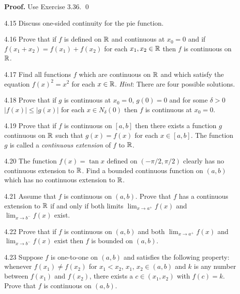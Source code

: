 \begin{enumerate}
      \textbf{Proof.} Use Exercise 3.36. \qed
   \item[4.15] Discuss one-sided continuity for the pie function.
   \item[4.16] Prove that if $f$ is defined on $\mathbb{R}$ and continuous at $x_0 = 0$
               and if $f(x_1 + x_2) = f(x_1) + f(x_2)$ for each
               $x_1, x_2 \in \mathbb{R}$ then $f$ is continuous on $\mathbb{R}$.
   \item[4.17] Find all functions $f$ which are continuous on $\mathbb{R}$ and which
               satisfy the equation $f(x)^2 = x^2$ for each $x \in \mathbb{R}$.
               \textit{Hint}: There are four possible solutions.
   \item[4.18] Prove that if $g$ is continuous at $x_0 = 0$, $g(0) = 0$ and for
               some $\delta > 0$ $|f(x)| \le |g(x)|$ for each
               $x \in N_\delta(0)$ then $f$ is continuous at $x_0 = 0$.
   \item[4.19] Prove that if $f$ is continuous on $[a, b]$ then there exists a
               function $g$ continuous on $\mathbb{R}$ such that $g(x) = f(x)$ for each
               $x \in [a, b]$. The function $g$ is called a
               \textit{continuous extension} of $f$ to $\mathbb{R}$.
   \item[4.20] The function $f(x) = \tan x$ defined on $(-\pi/2, \pi/2)$ clearly
               has no continuous extension to $\mathbb{R}$. Find a bounded continuous
               function on $(a, b)$ which has no continuous extension to $\mathbb{R}$.
   \item[4.21] Assume that $f$ is continuous on $(a, b)$. Prove that $f$ has a
               continuous extension to $\mathbb{R}$ if and only if both limits
               $\lim_{x\rightarrow a^+}f(x)$ and $\lim_{x\rightarrow b^-}f(x)$
               exist.
   \item[4.22] Prove that if $f$ is continuous on $(a, b)$ and both
               $\lim_{x\rightarrow a^+}f(x)$ and $\lim_{x\rightarrow b^-}f(x)$
               exist then $f$ is bounded on $(a, b)$.
   \item[4.23] Suppose $f$ is one-to-one on $(a, b)$ and satisfies the following
               property: whenever $f(x_1) \neq f(x_2)$ for $x_1 < x_2$, $x_1$,
               $x_2 \in (a, b)$ and $k$ is any number between $f(x_1)$ and
               $f(x_2)$, there exists a $c \in (x_1, x_2)$ with $f(c) = k$.
               Prove that $f$ is continuous on $(a, b)$.
\end{enumerate}
